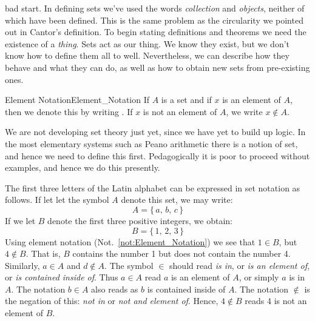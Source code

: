         bad start. In defining sets we've used the words \textit{collection} and
        \textit{objects}, neither of which have been defined. This is the same
        problem as the circularity we pointed out in Cantor's definition. To
        begin stating definitions and theorems we need the existence of a
        \textit{thing}. Sets act as our thing. We know they exist, but we don't
        know how to define them all to well. Nevertheless, we can describe how
        they behave and what they can do, as well as how to obtain new sets from
        pre-existing ones.
        \begin{fnotation}{Element Notation}{Element_Notation}
            If $A$ is a \gls{set} and if $x$ is an element
            of $A$, then we denote this by writing
            . If $x$ is not an element
            of $A$, we write $x\notin{A}$.
        \end{fnotation}
        We are not developing set theory just yet, since we have yet to build up
        logic. In the most elementary systems such as Peano arithmetic
        there is a notion of set, and hence we need to define this first.
        Pedagogically it is poor to proceed without examples, and hence we do
        this presently.
        \begin{example}
            The first three letters of the Latin alphabet can be expressed in
            set notation as follows. If let let the symbol $A$ denote this set,
            we may write:
            \begin{equation}
                A=\{\,a,\,b,\,c\,\}
            \end{equation}
            If we let $B$ denote the first three positive integers, we obtain:
            \begin{equation}
                B=\{\,1,\,2,\,3\,\}
            \end{equation}
            Using element notation (Not.~\ref{not:Element_Notation}) we see that
            $1\in{B}$, but $4\notin{B}$. That is, $B$ contains the number 1 but
            does not contain the number 4. Similarly, $a\in{A}$ and
            $d\notin{A}$. The symbol $\in$ should read \textit{is in}, or
            \textit{is an element of}, or \textit{is contained inside of}. Thus
            $a\in{A}$ read $a$ is an element of $A$, or simply $a$ is in $A$.
            The notation $b\in{A}$ also reads as $b$ is contained inside of $A$.
            The notation $\notin$ is the negation of this: \textit{not in} or
            \textit{not and element of}. Hence, $4\notin{B}$ reads 4 is not an
            element of $B$.
        \end{example}
